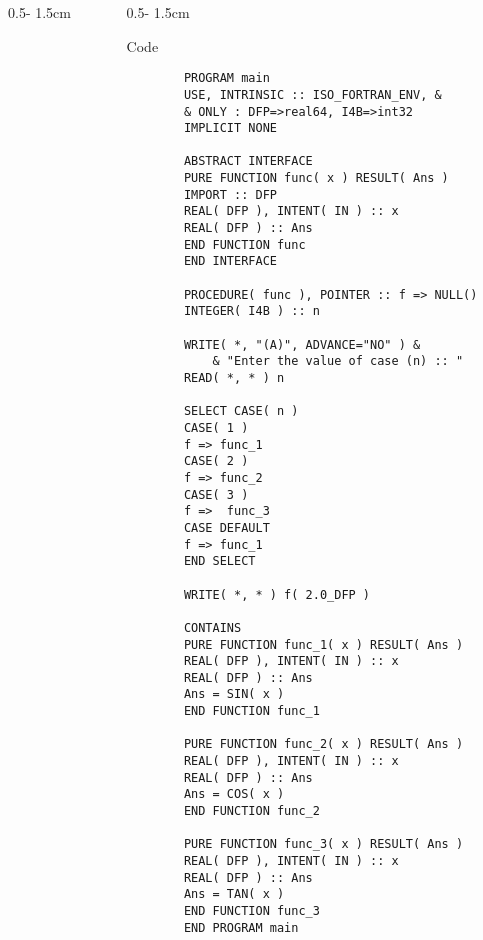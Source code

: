 \documentclass{uioposter}
\begin{document}
\begin{columns}[onlytextwidth]
\begin{column}{0.5\textwidth - 1.5cm}

\end{column}


\begin{column}{0.5\textwidth - 1.5cm}
    \begin{block}{Code}
    	\begin{verbatim}
    	PROGRAM main
    	USE, INTRINSIC :: ISO_FORTRAN_ENV, &
    	& ONLY : DFP=>real64, I4B=>int32
    	IMPLICIT NONE

    	ABSTRACT INTERFACE
    	PURE FUNCTION func( x ) RESULT( Ans )
    	IMPORT :: DFP
    	REAL( DFP ), INTENT( IN ) :: x
    	REAL( DFP ) :: Ans
    	END FUNCTION func
    	END INTERFACE

    	PROCEDURE( func ), POINTER :: f => NULL()
    	INTEGER( I4B ) :: n

    	WRITE( *, "(A)", ADVANCE="NO" ) &
    		& "Enter the value of case (n) :: "
    	READ( *, * ) n

    	SELECT CASE( n )
    	CASE( 1 )
    	f => func_1
    	CASE( 2 )
    	f => func_2
    	CASE( 3 )
    	f =>  func_3
    	CASE DEFAULT
    	f => func_1
    	END SELECT

    	WRITE( *, * ) f( 2.0_DFP )

    	CONTAINS
    	PURE FUNCTION func_1( x ) RESULT( Ans )
    	REAL( DFP ), INTENT( IN ) :: x
    	REAL( DFP ) :: Ans
    	Ans = SIN( x )
    	END FUNCTION func_1

    	PURE FUNCTION func_2( x ) RESULT( Ans )
    	REAL( DFP ), INTENT( IN ) :: x
    	REAL( DFP ) :: Ans
    	Ans = COS( x )
    	END FUNCTION func_2

    	PURE FUNCTION func_3( x ) RESULT( Ans )
    	REAL( DFP ), INTENT( IN ) :: x
    	REAL( DFP ) :: Ans
    	Ans = TAN( x )
    	END FUNCTION func_3
    	END PROGRAM main
    	\end{verbatim}
    \end{block}
\end{column}


\end{columns}
\end{document}
